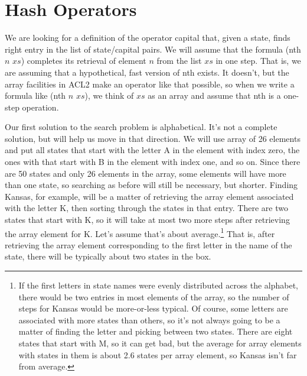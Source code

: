 \section{Hash Operators}

We are looking for a definition of the operator
\textsf{capital} that, given a state, finds right entry
in the list of state/capital pairs.
We will assume that the formula \textsf{(nth} $n$ $xs$\textsf{)}
completes its retrieval of element $n$ from the list $xs$
in one step. That is, we are assuming that a hypothetical,
fast version of \textsf{nth} exists. It doesn't, but the
array facilities in ACL2 make an operator like that possible,
so when we write a formula like
\textsf{(nth} $n$ $xs$\textsf{)},
we think of $xs$ as an array and assume that
\textsf{nth} is a one-step operation.

Our first solution to the search problem is alphabetical.
It's not a complete solution, but will help us move in that direction.
We will use array of 26 elements
and put all states that start with the letter A in
the element with index zero,
the ones with that start with B in the element with index one, and so on.
Since there are 50 states and only
26 elements in the array, some elements will have more than one state,
so searching as before will still be necessary, but shorter.
Finding Kansas, for example, will be
a matter of retrieving the array element associated with
the letter K, then sorting through the states in that entry.
There are two states that start with K,
so it will take at most two more steps after retrieving
the array element for K.  Let's assume that's about
average.\footnote{If the first letters in state names
were evenly distributed across the alphabet, there would be
two entries in most elements of the array, so the number of steps
for Kansas would be more-or-less typical.
Of course, some letters are associated with more states than
others, so it's not always going to be a matter of finding
the letter and picking between two states. There are eight
states that start with M, so it can get bad,
but the average for array elements with states in them
is about 2.6 states per array element, so
Kansas isn't far from average.}
That is, after retrieving the array element corresponding to
the first letter in the name of the state, there will
be typically about two states in the box.

